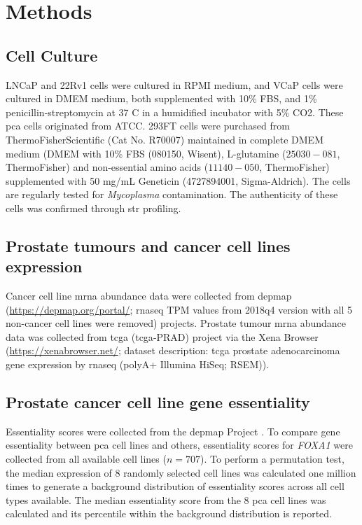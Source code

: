 \section{Methods}
\label{sec:FOXA1_methods}

\subsection{Cell Culture}

LNCaP and 22Rv1 cells were cultured in RPMI medium, and VCaP cells were cultured in DMEM medium, both supplemented with 10\% FBS, and 1\% penicillin-streptomycin at 37 \textdegree C in a humidified incubator with 5\% CO2.
These \gls{pca} cells originated from ATCC.
293FT cells were purchased from ThermoFisherScientific (Cat No. R70007) maintained in complete DMEM medium (DMEM with 10\% FBS (080150, Wisent), L-glutamine ($25030-081$, ThermoFisher) and non-essential amino acids ($11140-050$, ThermoFisher) supplemented with 50 mg/mL Geneticin (4727894001, Sigma-Aldrich).
The cells are regularly tested for \emph{Mycoplasma} contamination.
The authenticity of these cells was confirmed through \gls{str} profiling.

\subsection{Prostate tumours and cancer cell lines expression}

Cancer cell line \gls{mrna} abundance data were collected from \gls{depmap} (\url{https://depmap.org/portal/}; \gls{rnaseq} TPM values from 2018q4 version with all 5 non-cancer cell lines were removed) \cite{thecancercelllineencyclopediaconsortiumPharmacogenomicAgreementTwo2015} projects.
Prostate tumour \gls{mrna} abundance data was collected from \gls{tcga}  (\gls{tcga}-PRAD) project via the Xena Browser (\url{https://xenabrowser.net/}; dataset description: \gls{tcga} prostate adenocarcinoma gene expression by \gls{rnaseq} (polyA+ Illumina HiSeq; RSEM)).

\subsection{Prostate cancer cell line gene essentiality}

Essentiality scores were collected from the \gls{depmap} Project \cite{mcfarlandImprovedEstimationCancer2018}.
To compare gene essentiality between \gls{pca} cell lines and others, essentiality scores for \emph{FOXA1} were collected from all available cell lines ($n = 707$).
To perform a permutation test, the median expression of 8 randomly selected cell lines was calculated one million times to generate a background distribution of essentiality scores across all cell types available.
The median essentiality score from the 8 \gls{pca} cell lines was calculated and its percentile within the background distribution is reported.

